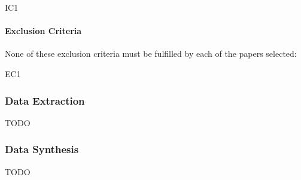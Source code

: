 				\begin{aligneddescription}{IC1}
					\item[IC1] \icOne
					\item[IC2] \icTwo
					\item[IC3] \icThree
				\end{aligneddescription}
				
			\paragraph{Exclusion Criteria}
				None of these exclusion criteria must be fulfilled by each of the papers selected:
			
				\begin{aligneddescription}{EC1}
					\item[EC1] \ecOne
				\end{aligneddescription}
		
		\subsubsection{Data Extraction}
			TODO
		
		\subsubsection{Data Synthesis}
			TODO
